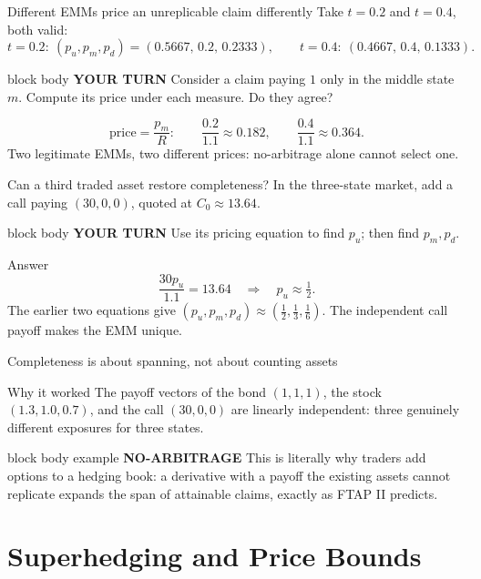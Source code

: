 \documentclass[handout,10pt,aspectratio=169]{beamer}
\newenvironment{marketbox}{\begin{beamercolorbox}[rounded=true,sep=0.7em,wd=\textwidth]{block body example}
  \textbf{\color{CourseGreen}NO-ARBITRAGE}\quad}{\end{beamercolorbox}}
\newenvironment{pausebox}{\begin{beamercolorbox}[rounded=true,sep=0.8em,wd=\textwidth]{block body}
  \textbf{\color{CourseGold}YOUR TURN}\quad}{\end{beamercolorbox}}
\newcommand{\1}{\mathbf 1}
\begin{document}
\begin{frame}{Different EMMs price an unreplicable claim differently}
Take \(t=0.2\) and \(t=0.4\), both valid:
\[
t=0.2:\ (p_u,p_m,p_d)=(0.5667,\,0.2,\,0.2333),
\qquad
t=0.4:\ (0.4667,\,0.4,\,0.1333).
\]
\begin{pausebox}
Consider a claim paying \(1\) only in the middle state \(m\). Compute its
price under each measure. Do they agree?
\end{pausebox}

\[
\text{price}=\frac{p_m}{R}:
\qquad
\frac{0.2}{1.1}\approx0.182,
\qquad
\frac{0.4}{1.1}\approx0.364.
\]
Two legitimate EMMs, two different prices: no-arbitrage alone cannot select
one.
\end{frame}

\begin{frame}{Can a third traded asset restore completeness?}
In the three-state market, add a call paying \((30,0,0)\), quoted at
\(C_0\approx13.64\).
\begin{pausebox}
Use its pricing equation to find \(p_u\); then find \(p_m,p_d\).
\end{pausebox}

\begin{exampleblock}{Answer}
\[
\frac{30p_u}{1.1}=13.64
\quad\Longrightarrow\quad p_u\approx\tfrac12.
\]
The earlier two equations give
\(\boxed{(p_u,p_m,p_d)\approx(\tfrac12,\tfrac13,\tfrac16)}\).
The independent call payoff makes the EMM unique.
\end{exampleblock}
\end{frame}



\begin{frame}{Completeness is about spanning, not about counting assets}
\begin{block}{Why it worked}
The payoff vectors of the bond \((1,1,1)\), the stock \((1.3,1.0,0.7)\), and
the call \((30,0,0)\) are linearly independent: three genuinely different
exposures for three states.
\end{block}
\begin{marketbox}
This is literally why traders add options to a hedging book: a derivative
with a payoff the existing assets cannot replicate expands the span of
attainable claims, exactly as FTAP II predicts.
\end{marketbox}
\end{frame}

\section{Superhedging and Price Bounds}
\end{document}
